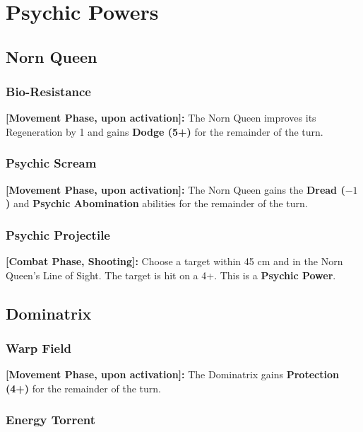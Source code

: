 \section{Psychic Powers}

\subsection{Norn Queen}

\subsubsection{Bio-Resistance}

\textbf{[Movement Phase, upon activation]:} The Norn Queen improves its Regeneration by 1 and gains \textbf{Dodge (5+)} for the remainder of the turn.

\subsubsection{Psychic Scream}

\textbf{[Movement Phase, upon activation]:} The Norn Queen gains the \textbf{Dread ($-1$)} and \textbf{Psychic Abomination} abilities for the remainder of the turn.

\subsubsection{Psychic Projectile}

\textbf{[Combat Phase, Shooting]:} Choose a target within 45 cm and in the Norn Queen's Line of Sight. The target is hit on a 4+. This is a \textbf{Psychic Power}.

\subsection{Dominatrix}

\subsubsection{Warp Field}

\textbf{[Movement Phase, upon activation]:} The Dominatrix gains \textbf{Protection (4+)} for the remainder of the turn.

\subsubsection{Energy Torrent}

